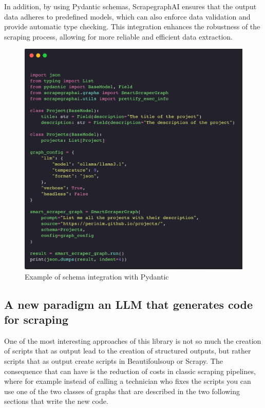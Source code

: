 In addition, by using Pydantic schemas, ScrapegraphAI ensures that the output data adheres to predefined models, which can also enforce data validation and provide automatic type checking. This integration enhances the robustness of the scraping process, allowing for more reliable and efficient data extraction.

\begin{figure}[h!]
    \centering
    \includegraphics[width=1\linewidth]{Assets/schema_integration.png}
    \caption{Example of schema integration with Pydantic}
    \label{fig:enter-label}
\end{figure}


\subsection{A new paradigm an LLM that generates code for scraping}
One of the most interesting approaches of this library is not so much the creation of scripts that as output lead to the creation of structured outputs, but rather scripts that as output create scripts in Beautifoulsoup or Scrapy.
The consequence that can have is the reduction of costs in classic scraping pipelines, where for example instead of calling a technician who fixes the scripts you can use one of the two classes of graphs that are described in the two following sections that write the new code.


